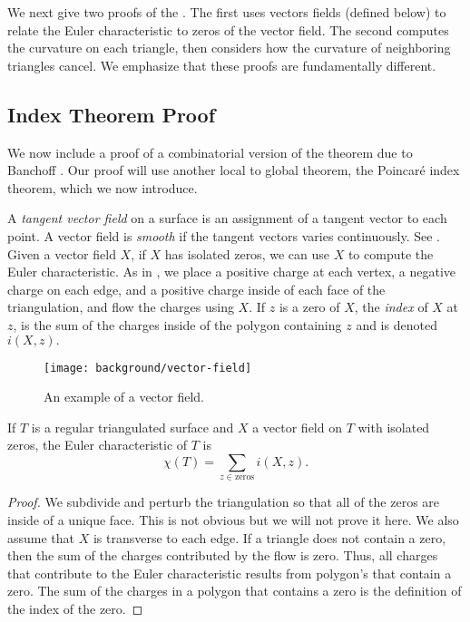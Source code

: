 We next give two proofs of the . The first uses vectors fields (defined below)
to relate the Euler characteristic to zeros of the vector field. The second computes
the curvature on each triangle, then considers how the curvature of neighboring triangles
cancel. We emphasize that these proofs are fundamentally different.

\subsection{Index Theorem Proof}



We now include a proof of a combinatorial version of the theorem due to Banchoff
\cite{banchoff_critical_1970}. Our proof will use another local to global theorem,
the Poincar\'e index theorem, which we now introduce.

A \emph{tangent vector field} on a surface is an assignment of a tangent
vector to each point. A vector field is \emph{smooth} if the tangent vectors
varies continuously. See .
Given a vector field $X$, if $X$ has isolated zeros, we
can use $X$ to compute the Euler characteristic.
As in , we place a positive charge at each vertex, a negative charge on
each edge, and a positive charge inside of each face of the triangulation, and flow
the charges using $X$. If $z$ is a zero of $X$, the \emph{index} of $X$ at $z$,
is the sum of the charges inside of the polygon containing $z$ and is denoted
$i(X,z).$

 \begin{figure}[htb]
         \centering
         \texttt{[image: background/vector-field]}
	\caption{An example of a vector field.
	\label{fig:vector-field}}
 \end{figure}
 

\begin{theorem} \label{thm:poincare-index}

If $T$ is a regular triangulated surface and $X$ a vector field on $T$ with isolated zeros,
the Euler characteristic of $T$ is 
$$\chi(T)=\sum_{z\in \text{zeros}}i(X,z).$$
\end{theorem}

\begin{proof}
We subdivide and perturb the triangulation so that all of the zeros are inside of a unique face.
This is not obvious but we will not prove it here.
We also assume that $X$ is transverse to each edge.
If a triangle does not contain a zero, then the sum of the charges
contributed by the flow is zero.
Thus, all charges that contribute to the Euler characteristic
results from polygon's that contain a zero.
The sum of the charges in a polygon that contains a zero is the definition of the index
of the zero.

\end{proof}

